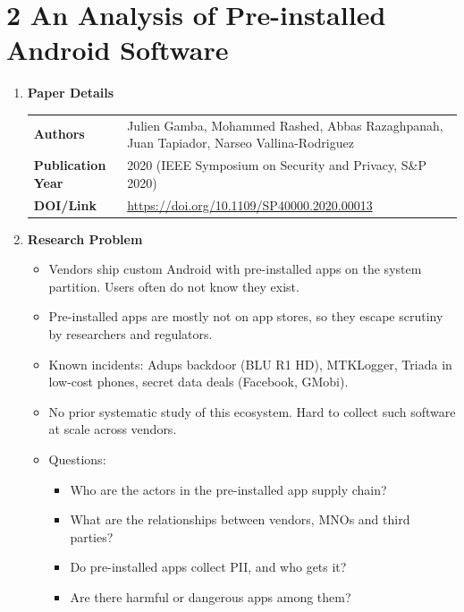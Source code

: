 \documentclass[11pt,a4paper]{article}
\newcommand{\entrypart}[1]{\textbf{\color{accent}#1}\par\vspace{2pt}}
\begin{document}
\newpage

\section{2 An Analysis of Pre-installed Android Software}

\begin{enumerate}

    \item \entrypart{Paper Details}

    \begin{tabular}{@{}>{\bfseries}p{3.2cm} p{11.5cm}@{}}
        Authors          & Julien Gamba, Mohammed Rashed, Abbas Razaghpanah, Juan Tapiador, Narseo Vallina-Rodriguez \\[2pt]
        Publication Year & 2020 (IEEE Symposium on Security and Privacy, S\&P 2020) \\[2pt]
        DOI/Link         & \url{https://doi.org/10.1109/SP40000.2020.00013}
    \end{tabular}

    \item \entrypart{Research Problem}

    \begin{itemize}
        \item Vendors ship custom Android with pre-installed apps on the system partition. Users often do not know they exist.
        \item Pre-installed apps are mostly not on app stores, so they escape scrutiny by researchers and regulators.
        \item Known incidents: Adups backdoor (BLU R1 HD), MTKLogger, Triada in low-cost phones, secret data deals (Facebook, GMobi).
        \item No prior systematic study of this ecosystem. Hard to collect such software at scale across vendors.
        \item Questions:
        \begin{itemize}
            \item Who are the actors in the pre-installed app supply chain?
            \item What are the relationships between vendors, MNOs and third parties?
            \item Do pre-installed apps collect PII, and who gets it?
            \item Are there harmful or dangerous apps among them?
        \end{itemize}
    \end{itemize}


\end{enumerate}
\end{document}
